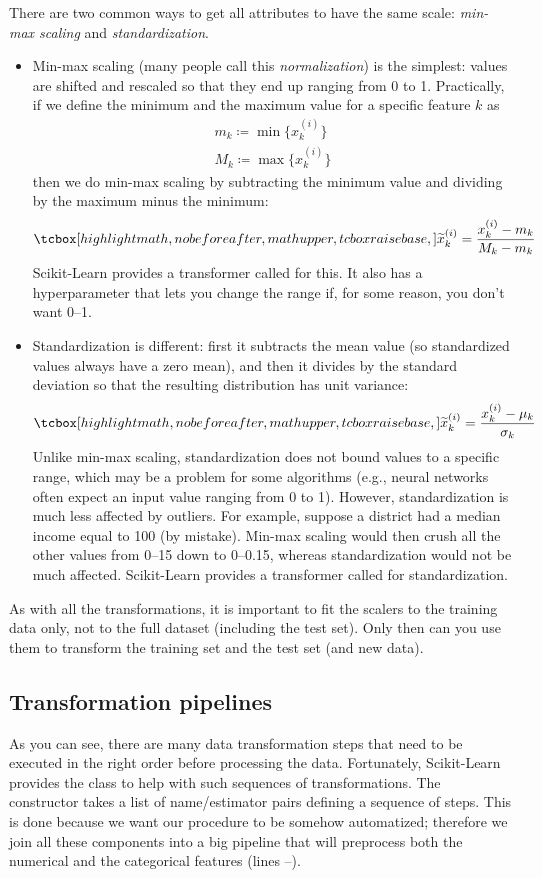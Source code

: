 There are two common ways to get all attributes to have the same scale: \emph{min-max scaling} and \emph{standardization}.
\begin{itemize}
\item Min-max scaling (many people call this \emph{normalization}) is the simplest: values are shifted and rescaled so that they end up ranging from 0 to 1. Practically, if we define the minimum and the maximum value for a specific feature $k$ as
\begin{gather}
m_k\coloneqq\min{\bigl\{x_k^{(i)}\bigr\}}\\
M_k\coloneqq\max{\bigl\{x_k^{(i)}\bigr\}}
\end{gather}
then we do min-max scaling by subtracting the minimum value and dividing by the maximum minus the minimum:
\begin{equation}
\tcbhighmath{\widetilde{x}_k^{(i)}=\frac{x_k^{(i)}-m_k}{M_k-m_k}}
\end{equation}
Scikit-Learn provides a transformer called  for this. It also has a  hyperparameter that lets you change the range if, for some reason, you don't want 0--1.
\item Standardization is different: first it subtracts the mean value (so standardized values always have a zero mean), and then it divides by the standard deviation so that the resulting distribution has unit variance:
\begin{equation}
\tcbhighmath{\widetilde{x}_k^{(i)}=\frac{x_k^{(i)}-\mu_k}{\sigma_k}}
\end{equation}
Unlike min-max scaling, standardization does not bound values to a specific range, which may be a
problem for some algorithms (e.g., neural networks often expect an input value ranging from 0 to 1). However, standardization is much less affected by outliers. For example, suppose a district had a median income equal to 100 (by mistake). Min-max scaling would then crush all the other values from 0--15 down to 0--0.15, whereas standardization would not be much affected. Scikit-Learn provides a transformer called  for standardization.
\end{itemize}
As with all the transformations, it is important to fit the scalers to the training data only, not to the full dataset (including the test set). Only then can you use them to transform the training set and the test set (and new data).
\subsection{Transformation pipelines}
As you can see, there are many data transformation steps that need to be executed in the right order before processing the data. Fortunately, Scikit-Learn provides the  class to help with such sequences of transformations. The  constructor takes a list of name/estimator pairs defining a sequence of steps. This is done because we want our procedure to be somehow automatized; therefore we join all these components into a big pipeline that will preprocess both the numerical and the categorical features (lines --).
